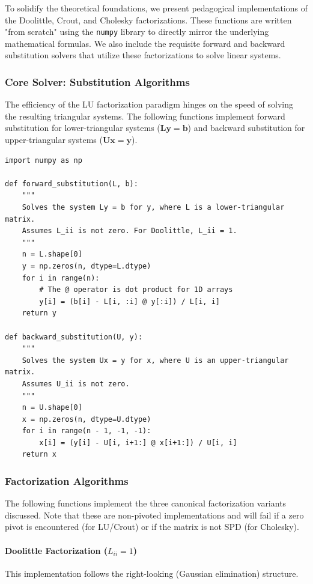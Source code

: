 To solidify the theoretical foundations, we present pedagogical implementations of the Doolittle, Crout, and Cholesky factorizations. These functions are written "from scratch" using the \texttt{numpy} library to directly mirror the underlying mathematical formulas. We also include the requisite forward and backward substitution solvers that utilize these factorizations to solve linear systems.

\subsubsection*{Core Solver: Substitution Algorithms}
The efficiency of the LU factorization paradigm hinges on the speed of solving the resulting triangular systems. The following functions implement forward substitution for lower-triangular systems ($\mathbf{L}\mathbf{y} = \mathbf{b}$) and backward substitution for upper-triangular systems ($\mathbf{U}\mathbf{x} = \mathbf{y}$).

\begin{verbatim}
import numpy as np

def forward_substitution(L, b):
    """
    Solves the system Ly = b for y, where L is a lower-triangular matrix.
    Assumes L_ii is not zero. For Doolittle, L_ii = 1.
    """
    n = L.shape[0]
    y = np.zeros(n, dtype=L.dtype)
    for i in range(n):
        # The @ operator is dot product for 1D arrays
        y[i] = (b[i] - L[i, :i] @ y[:i]) / L[i, i]
    return y

def backward_substitution(U, y):
    """
    Solves the system Ux = y for x, where U is an upper-triangular matrix.
    Assumes U_ii is not zero.
    """
    n = U.shape[0]
    x = np.zeros(n, dtype=U.dtype)
    for i in range(n - 1, -1, -1):
        x[i] = (y[i] - U[i, i+1:] @ x[i+1:]) / U[i, i]
    return x
\end{verbatim}

\subsubsection*{Factorization Algorithms}
The following functions implement the three canonical factorization variants discussed. Note that these are non-pivoted implementations and will fail if a zero pivot is encountered (for LU/Crout) or if the matrix is not SPD (for Cholesky).

\paragraph{Doolittle Factorization ($L_{ii} = 1$)}
This implementation follows the right-looking (Gaussian elimination) structure.

